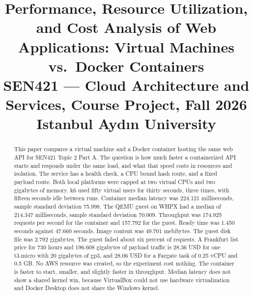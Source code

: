 \documentclass[conference,a4paper]{IEEEtran}
\begin{document}
\title{Performance, Resource Utilization, and Cost Analysis of Web Applications: Virtual Machines vs.\ Docker Containers\\
	{\footnotesize SEN421 --- Cloud Architecture and Services, Course Project, Fall 2026\\
		Istanbul Ayd\i n University}
}

\author{
}

\maketitle

\begin{abstract}
This paper compares a virtual machine and a Docker container hosting the same web API for SEN421 Topic 2 Part A. The question is how much faster a containerized API starts and responds under the same load, and what that speed costs in resources and isolation. The service has a health check, a CPU bound hash route, and a fixed payload route. Both local platforms were capped at two virtual CPUs and two gigabytes of memory. k6 used fifty virtual users for thirty seconds, three times, with fifteen seconds idle between runs. Container median latency was 224.121 milliseconds, sample standard deviation 75.998. The QEMU guest on WHPX had a median of 214.347 milliseconds, sample standard deviation 70.009. Throughput was 174.925 requests per second for the container and 157.792 for the guest. Ready time was 1.450 seconds against 47.660 seconds. Image content was 49.701 mebibytes. The guest disk file was 2.792 gigabytes. The guest failed about six percent of requests. A Frankfurt list price for 730 hours and 196.608 gigabytes of payload traffic is 28.36 USD for one t3.micro with 20 gigabytes of gp3, and 28.06 USD for a Fargate task of 0.25 vCPU and 0.5 GB. No AWS resource was created, so the experiment cost nothing. The container is faster to start, smaller, and slightly faster in throughput. Median latency does not show a shared kernel win, because VirtualBox could not use hardware virtualization and Docker Desktop does not share the Windows kernel.
\end{abstract}
\end{document}
